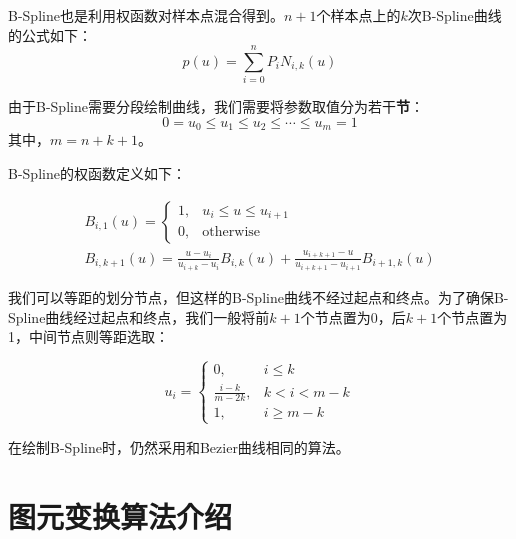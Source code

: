 \documentclass[a4paper,12pt]{article}
\begin{document}
B-Spline也是利用权函数对样本点混合得到。$n+1$个样本点上的$k$次B-Spline曲线的公式如下：
$$ p(u) = \sum_{i=0}^n P_i N_{i, k}(u) $$

由于B-Spline需要分段绘制曲线，我们需要将参数取值分为若干\textbf{节}：
$$0 = u_0 \leq u_1 \leq u_2 \leq \cdots \leq u_m = 1$$
其中，$m = n + k + 1$。

B-Spline的权函数定义如下\cite{blog:bspline}：

\begin{gather}
B_{i, 1}(u) = 
\begin{cases} 1, & u_i \leq u \leq u_{i+1} \\ 
              0, & \text{otherwise} 
\end{cases} \\
B_{i, k+1}(u) = \frac{u - u_i}{u_{i+k} - u_i} B_{i,k}(u) + 
	\frac{u_{i+k+1} - u}{u_{i+k+1} - u_{i+1}}B_{i+1, k}(u)
\end{gather}

我们可以等距的划分节点，但这样的B-Spline曲线不经过起点和终点。为了确保B-Spline曲线经过起点和终点，我们一般将前$k+1$个节点置为0，后$k+1$个节点置为1，中间节点则等距选取：

$$ u_i = \begin{cases}
0, & i \leq k \\
\frac{i - k}{m - 2k}, & k < i < m - k \\
1, & i \geq m - k
\end{cases}
$$

在绘制B-Spline时，仍然采用和Bezier曲线相同的算法。

\section{图元变换算法介绍}
\end{document}
